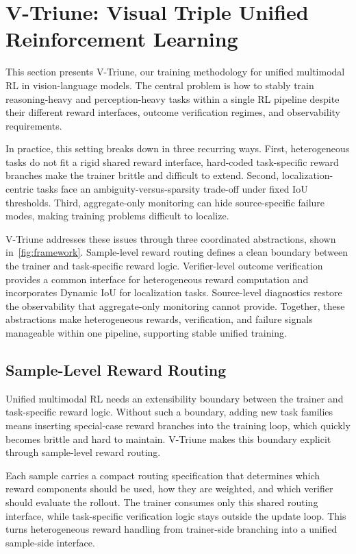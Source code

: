\section{V-Triune: Visual Triple Unified Reinforcement Learning}
\label{sec:method}

This section presents V-Triune, our training methodology for unified multimodal RL in vision-language models.
%
The central problem is how to stably train reasoning-heavy and perception-heavy tasks within a single RL pipeline despite their different reward interfaces, outcome verification regimes, and observability requirements.

In practice, this setting breaks down in three recurring ways.
%
First, heterogeneous tasks do not fit a rigid shared reward interface, hard-coded task-specific reward branches make the trainer brittle and difficult to extend.
%
Second, localization-centric tasks face an ambiguity-versus-sparsity trade-off under fixed IoU thresholds.
%
Third, aggregate-only monitoring can hide source-specific failure modes, making training problems difficult to localize.

V-Triune addresses these issues through three coordinated abstractions, shown in~\cref{fig:framework}.
%
Sample-level reward routing defines a clean boundary between the trainer and task-specific reward logic.
%
Verifier-level outcome verification provides a common interface for heterogeneous reward computation and incorporates Dynamic IoU for localization tasks.
%
Source-level diagnostics restore the observability that aggregate-only monitoring cannot provide.
%
Together, these abstractions make heterogeneous rewards, verification, and failure signals manageable within one pipeline, supporting stable unified training.
%
\subsection{Sample-Level Reward Routing}
\label{subsec:sample_level_formatting}

Unified multimodal RL needs an extensibility boundary between the trainer and task-specific reward logic.
%
Without such a boundary, adding new task families means inserting special-case reward branches into the training loop, which quickly becomes brittle and hard to maintain.
%
V-Triune makes this boundary explicit through sample-level reward routing.

Each sample carries a compact routing specification that determines which reward components should be used, how they are weighted, and which verifier should evaluate the rollout.
%
The trainer consumes only this shared routing interface, while task-specific verification logic stays outside the update loop.
%
This turns heterogeneous reward handling from trainer-side branching into a unified sample-side interface.

